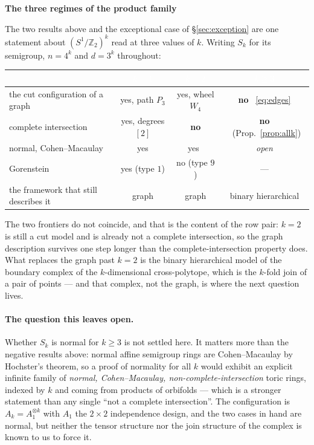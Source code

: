 \documentclass[11pt,a4paper]{article}
\theoremstyle{definition}
\newcommand{\ZZ}{\mathbb{Z}}
\newenvironment{ficha}[1]{%
  \par\medskip\begin{lrbox}{\fichabox}\begin{minipage}{0.93\textwidth}%
  {\normalsize\bfseries\color{hdrblue}#1}\par\medskip\small%
}{%
  \end{minipage}\end{lrbox}%
  \begin{center}\setlength{\fboxsep}{9pt}%
  \fcolorbox{hdrblue}{softgrey}{\usebox{\fichabox}}\end{center}\par\medskip%
}
\begin{document}
\begin{ficha}{The three regimes of the product family}
\noindent
The two results above and the exceptional case of \S\ref{sec:exception} are one statement about
$(S^1/\ZZ_2)^k$ read at three values of $k$. Writing $S_k$ for its semigroup, $n=4^k$ and
$d=3^k$ throughout:

\smallskip
\centering\small
\begin{tabular}{lccc}
\toprule
\rowcolor{hdrblue}
& \textcolor{white}{$k=1$} & \textcolor{white}{$k=2$} & \textcolor{white}{$k\ge3$}\\
\midrule
the cut configuration of a graph & yes, path $P_3$ & yes, wheel $W_4$ &
\textbf{no} \ \eqref{eq:edges}\\
\rowcolor{softgrey}
complete intersection & yes, degrees $[2]$ & \textbf{no} & \textbf{no} \ (Prop.~\ref{prop:allk})\\
normal, Cohen--Macaulay & yes & yes~\cite{SScuts} & \emph{open}\\
\rowcolor{softgrey}
Gorenstein & yes (type $1$) & no (type $9$) & ---\\
the framework that still describes it & graph & graph & binary hierarchical\\
\bottomrule
\end{tabular}

\smallskip\raggedright\noindent
The two frontiers do not coincide, and that is the content of the row pair: $k=2$ is still a cut
model and is already not a complete intersection, so the graph description survives one step longer
than the complete-intersection property does. What replaces the graph past $k=2$ is the binary
hierarchical model of the boundary complex of the $k$-dimensional cross-polytope, which is the
$k$-fold join of a pair of points --- and that complex, not the graph, is where the next question
lives.
\end{ficha}

\paragraph{The question this leaves open.} Whether $S_k$ is normal for $k\ge3$ is not settled here.
It matters more than the negative results above: normal affine semigroup rings are Cohen--Macaulay
by Hochster's theorem, so a proof of normality for all $k$ would exhibit an explicit infinite family
of \emph{normal, Cohen--Macaulay, non-complete-intersection} toric rings, indexed by $k$ and coming
from products of orbifolds --- which is a stronger statement than any single ``not a complete
intersection''. The configuration is $A_k=A_1^{\otimes k}$ with $A_1$ the $2\times2$ independence
design, and the two cases in hand are normal, but neither the tensor structure nor the join
structure of the complex is known to us to force it.
\end{document}
